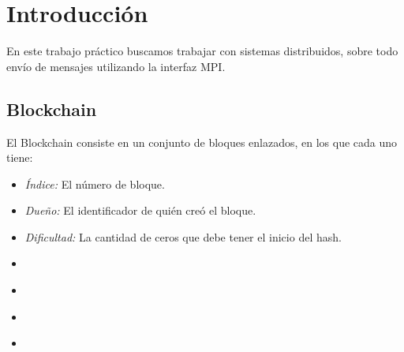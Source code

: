\section{Introducción}





En este trabajo pr\'actico buscamos trabajar con sistemas distribuidos, sobre todo env\'io de mensajes utilizando la interfaz MPI.







\subsection{Blockchain}
El Blockchain consiste en un conjunto de bloques enlazados, en los que cada uno tiene:
\begin{itemize}
	\item \textit{\'Indice:} El n\'umero de bloque.
	\item \textit{Due\~no:} El identificador de qui\'en cre\'o el bloque.
	\item \textit{Dificultad:} La cantidad de ceros que debe tener el inicio del hash.
	\item \textit{}
	\item \textit{}
	\item \textit{}
	\item \textit{}
\end{itemize}